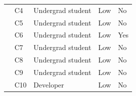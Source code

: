 \documentclass[conference]{IEEEtran}
\begin{document}
\begin{table}[tb]
{\begin{tabular}{lllp{1.1cm}p{1.1cm}}
				& C4                                          & Undergrad student & Low & No \\
				& C5                                          & Undergrad student & Low & No \\
				& C6                                          & Undergrad student & Low & Yes \\
				& C7                                          & Undergrad student & Low & No \\
				& C8                                          & Undergrad student & Low & No \\
				& C9                                          & Undergrad student & Low & No \\
				& C10                                         & Developer & Low & No \\
				\bottomrule
			\end{tabular}
		}
		\label{table:participants}
	\end{table}
	
	
	
	
	
\end{document}
